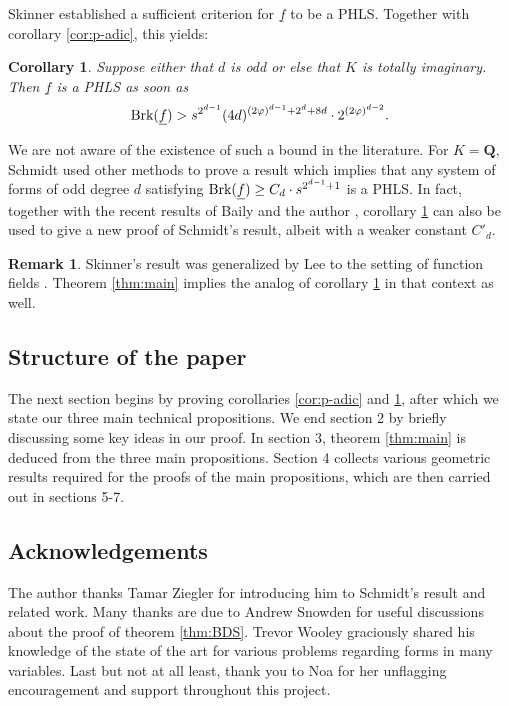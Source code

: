 \documentclass[12pt]{amsart}
\let\ul\underline
\newtheorem{corollary}[theorem]{Corollary}
\theoremstyle{definition}
\newtheorem{remark}[theorem]{Remark}
\newcommand{\Q}{\mathbf{Q}}
\newcommand{\brk}{\textnormal{Brk}}
\let\ul\underline
\begin{document}
Skinner \cite{Skinner-HLS} established a sufficient criterion for $\ul{f}$ to be a PHLS. Together with corollary \ref{cor:p-adic}, this yields: 

\begin{corollary}\label{cor:PHLS}
    Suppose either that $d$ is odd or else that $K$ is totally imaginary. Then $\ul{f}$ is a PHLS as soon as
    \[
    \brk(\ul{f}) > s^{2^{d-1}} (4d)^{(2\varphi)^{d-1}+2^d+8d}  \cdot 2^{(2\varphi)^{d-2}}.
    \]
\end{corollary}

We are not aware of the existence of such a bound in the literature. For  $K=\Q, $ Schmidt used other methods to prove a result \cite[supplement to theorem II]{Schmidt} which implies that any system of forms of odd degree $d$ satisfying $\brk(\ul{f}) \ge C_d\cdot  s^{2^{d-1}+1}$ is a PHLS. In fact, together with the recent results of Baily and the author \cite{BL}, corollary \ref{cor:PHLS} can also be used to give a new proof of Schmidt's result, albeit with a weaker constant $C'_d.$ 

\begin{remark}
    Skinner's result was generalized by Lee to the setting of function fields \cite{Lee}. Theorem \ref{thm:main} implies the analog of corollary \ref{cor:PHLS} in that context as well.
\end{remark}



\subsection{Structure of the paper}
The next section begins by proving corollaries \ref{cor:p-adic} and \ref{cor:PHLS}, after which we state our three main technical propositions. We end section 2 by briefly discussing some key ideas in our proof. In section 3, theorem \ref{thm:main} is deduced from the three main propositions. Section 4 collects various geometric results required for the proofs of the main propositions, which are then carried out in sections 5-7.  

\subsection{Acknowledgements} The author thanks Tamar Ziegler for introducing him to Schmidt's result \cite{Schmidt} and related work. Many thanks are due to Andrew Snowden for useful discussions about the proof of theorem \ref{thm:BDS}. Trevor Wooley graciously shared his knowledge of the state of the art for various problems regarding forms in many variables. Last but not at all least, thank you to Noa for her unflagging encouragement and support throughout this project.
\end{document}
